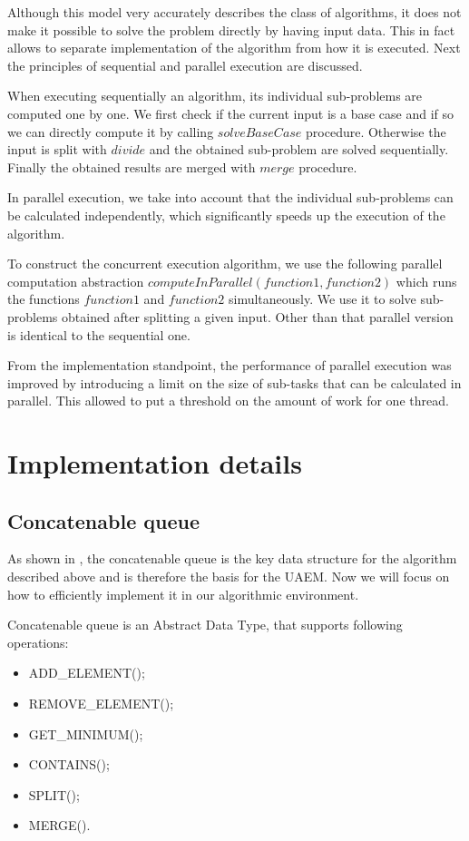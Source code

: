 \documentclass[twoside,twocolumn,10pt]{article}
\begin{document}
	Although this model very accurately describes the class of algorithms, it does not make it possible to solve the problem directly by having input data. This in fact allows to separate implementation of the algorithm from how it is executed. Next the principles of sequential and parallel execution are discussed.
	
	When executing sequentially an algorithm, its individual sub-problems are computed one by one. We first check if the current input is a base case and if so we can directly compute it by calling $solveBaseCase$ procedure. Otherwise the input is split with $divide$ and the obtained sub-problem are solved sequentially. Finally the obtained results are merged with $merge$ procedure.
	
	In parallel execution, we take into account that the individual sub-problems can be calculated independently, which significantly speeds up the execution of the algorithm.
	
	To construct the concurrent execution algorithm, we use the following parallel computation abstraction $computeInParallel(function1, function2)$ which runs the functions $function1$ and $function2$ simultaneously. We use it to solve sub-problems obtained after splitting a given input. Other than that parallel version is identical to the sequential one.
	
	From the implementation standpoint, the performance of parallel execution was improved by introducing a limit on the size of sub-tasks that can be calculated in parallel. This allowed to put a threshold on the amount of work for one thread.
	
\section{Implementation details}
\label{sec:implementation-details}
\subsection{Concatenable queue}

	As shown in \cite{overmars}, the concatenable queue is the key data structure for the algorithm described above and is therefore the basis for the UAEM. Now we will focus on how to efficiently implement it in our algorithmic environment.
	
	Concatenable queue is an Abstract Data Type, that supports following operations:
	
	\begin{itemize}
		\item
		ADD\_ELEMENT();
		\item
		REMOVE\_ELEMENT();
		\item
		GET\_MINIMUM();
		\item
		CONTAINS();
		\item
		SPLIT();
		\item
		MERGE().
	\end{itemize}
	
\end{document}
